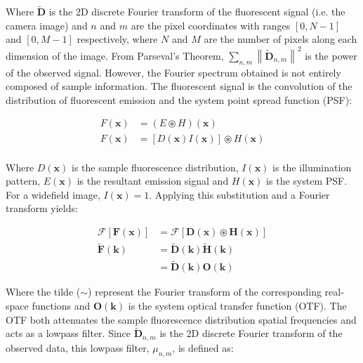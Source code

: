 Where $\tilde{\textbf{D}}$ is the 2D discrete Fourier transform of 
the fluorescent signal (i.e. the camera image) and $n$ and 
$m$ are the pixel coordinates with ranges $[0, N-1]$ and $[0, M-1]$ 
respectively, where $N$ and $M$ are the number of pixels along each 
dimension of the image. From Parseval's Theorem, $\sum\limits_{n,m}
\left\| \tilde{\textbf{D}}_{n,m} \right\|^2$ is the power of the 
observed signal. However, the Fourier spectrum obtained is not 
entirely composed of sample information. The fluorescent signal is the 
convolution of the distribution of fluorescent emission and the system 
point spread function (PSF):

\begin{equation}\label{eq:fluorescent_image}
\begin{split}
F(\textbf{x}) &= (E \circledast H)(\textbf{x})\\
F(\textbf{x}) &= [D(\textbf{x})I(\textbf{x})] \circledast H(\textbf{x})\\
\end{split}
\end{equation}

Where $D(\textbf{x})$ is the sample fluorescence distribution,
$I(\textbf{x})$ is the illumination pattern, $E(\textbf{x})$ is the 
resultant emission signal and $H(\textbf{x})$ is the system PSF. 
For a widefield image, $I(\textbf{x}) = 1$. Applying this 
substitution and a Fourier transform yields:


\begin{equation}\label{eq:fluor_signal_fourier}
\begin{split}
\mathcal{F}[\textbf{F}(\textbf{x})] &= \mathcal{F}[\textbf{D}(\textbf{x}) \circledast \textbf{H}(\textbf{x})]\\
\tilde{\textbf{F}}(\textbf{k}) &= \tilde{\textbf{D}}(\textbf{k}) \tilde{\textbf{H}}(\textbf{k})\\
&= \tilde{\textbf{D}}(\textbf{k}) \textbf{O}(\textbf{k})		
\end{split}
\end{equation}

Where the tilde ($\sim$) represent the Fourier transform of the corresponding 
real-space functions and $\textbf{O}(\textbf{k})$ is the system optical transfer 
function (OTF).\cite{gustafsson2008three} The OTF both attenuates the sample 
fluorescence distribution spatial frequencies and acts as a lowpass filter. 
Since $\tilde{\textbf{D}}_{n,m}$ is the 2D discrete Fourier transform of 
the observed data, this lowpass filter, $\mu_{n,m}$, is defined as:

